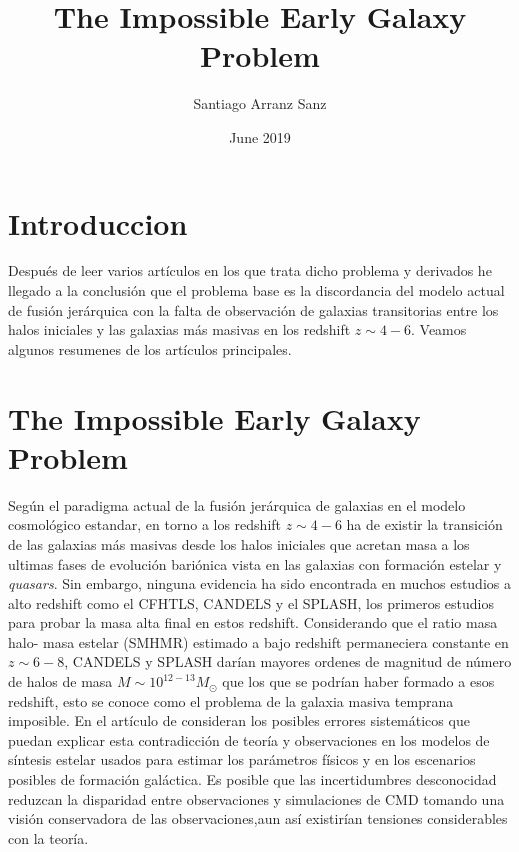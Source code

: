 \documentclass{article}
\title{The Impossible  Early Galaxy Problem}
\author{Santiago Arranz Sanz }
\date{June 2019}
\begin{document}
\maketitle

\section*{Introduccion}

Después de leer varios artículos en los que trata dicho problema y derivados he llegado a la conclusión que el problema base es la discordancia del modelo actual de fusión jerárquica con la falta de observación de galaxias transitorias entre los halos iniciales y las galaxias más masivas en los redshift $z\sim 4-6$. Veamos algunos resumenes de los artículos principales.

\section*{The Impossible Early Galaxy Problem}
\citep{steinhardt2016impossibly} Según el paradigma actual de la fusión jerárquica de galaxias en el modelo cosmológico estandar, en torno a los redshift $z\sim 4-6$ ha de existir la transición de las galaxias más masivas desde los halos iniciales que acretan masa a los ultimas fases de evolución bariónica vista en las galaxias con formación estelar y \textit{quasars}. Sin embargo, ninguna evidencia ha sido encontrada en muchos estudios a alto redshift como el CFHTLS, CANDELS y el SPLASH, los primeros estudios para probar la masa alta final en estos redshift. Considerando que el ratio masa halo- masa estelar (SMHMR) estimado a bajo redshift permaneciera constante en $z\sim 6-8$, CANDELS y SPLASH darían mayores ordenes de magnitud de número de halos de masa $M\sim 10^{12-13}M_\odot$ que los que se podrían haber formado a esos redshift, esto se conoce como el problema de la galaxia masiva temprana imposible. En el artículo de \cite{steinhardt2016impossibly} consideran los posibles errores sistemáticos que puedan explicar esta contradicción de teoría y observaciones en los modelos de síntesis estelar usados para estimar los parámetros físicos  y en los escenarios posibles de formación galáctica. Es posible que las incertidumbres desconocidad reduzcan la disparidad entre observaciones y simulaciones de CMD tomando una visión conservadora de las observaciones,aun así existirían tensiones considerables con la teoría.\\
\end{document}
